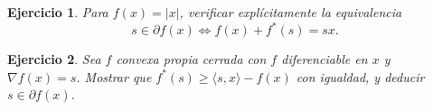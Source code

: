 \documentclass[11pt]{report}
\newtheorem{ex}{Ejercicio}
\newcommand{\indic}{I}
\newcommand{\supp}{\sigma}
\newcommand{\subdiff}{\partial}
\begin{document}
\begin{ex}
Para $f(x)=|x|$, verificar explícitamente la equivalencia
\[
  s\in\subdiff f(x)
  \iff f(x)+f^*(s)=sx.
\]
\end{ex}

\begin{ex}
Sea $f$ convexa propia cerrada con $f$ diferenciable en $x$ y
$\nabla f(x)=s$. Mostrar que $f^*(s)\ge\langle s,x\rangle-f(x)$
con igualdad, y deducir $s\in\subdiff f(x)$.
\end{ex}

\end{document}
